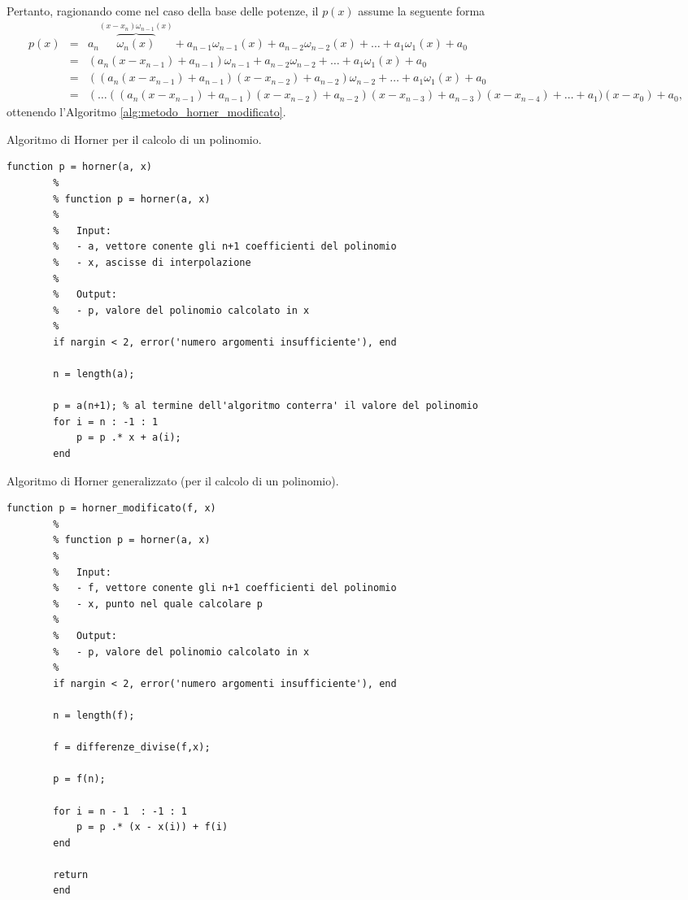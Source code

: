 
\noindent Pertanto, ragionando come nel caso della base delle potenze, il $p(x)$ assume la seguente forma
\begin{equation*}
	\begin{matrix}
		p(x) &=& a_n \overbrace{\omega_{n}(x)}^{(x-x_n)\omega_{n-1}(x)} + a_{n-1} \omega_{n-1}(x) + a_{n-2} \omega_{n-2}(x) + \hdots + a_1 \omega_1(x) + a_0\\
		&=& (a_n (x-x_{n-1}) + a_{n-1}) \omega_{n-1} + a_{n-2} \omega_{n-2} + \hdots + a_1 \omega_1(x) + a_0\\
		&=& ((a_n (x - x_{n-1}) + a_{n-1})(x-x_{n-2}) + a_{n-2})\omega_{n-2} + \hdots + a_1 \omega_1(x) + a_0\\
		&=& (\hdots ((a_n (x-x_{n-1}) + a_{n-1})(x - x_{n-2}) + a_{n-2})(x-x_{n-3}) + a_{n-3})(x-x_{n-4}) + \hdots + a_1 ) (x-x_0) + a_0,
	\end{matrix}
\end{equation*}
ottenendo l'Algoritmo \ref{alg:metodo_horner_modificato}.

\begin{algorithm}
\caption{Algoritmo di Horner per il calcolo di un polinomio.}\label{alg:metodo_horner}
    \begin{lstlisting}[style=Matlab-editor]
    	function p = horner(a, x)
    	%
    	% function p = horner(a, x)
    	%
    	%	Input: 
    	%	- a, vettore conente gli n+1 coefficienti del polinomio
    	%	- x, ascisse di interpolazione
    	%
    	%	Output:
    	%	- p, valore del polinomio calcolato in x
    	%
    	if nargin < 2, error('numero argomenti insufficiente'), end 
    	
    	n = length(a);
    	
        p = a(n+1); % al termine dell'algoritmo conterra' il valore del polinomio
        for i = n : -1 : 1
            p = p .* x + a(i);
        end
    \end{lstlisting}
\end{algorithm}

\begin{algorithm}
\caption{Algoritmo di Horner generalizzato (per il calcolo di un polinomio).}\label{alg:metodo_horner_modificato}
    \begin{lstlisting}[style=Matlab-editor]
    	function p = horner_modificato(f, x)
    	% 
    	% function p = horner(a, x)
    	%
    	%	Input: 
    	%	- f, vettore conente gli n+1 coefficienti del polinomio
    	%	- x, punto nel quale calcolare p
    	%
    	%	Output:
    	%	- p, valore del polinomio calcolato in x
    	%
    	if nargin < 2, error('numero argomenti insufficiente'), end 
    	
    	n = length(f);
    	
    	f = differenze_divise(f,x);
    	
        p = f(n);
        
        for i = n - 1  : -1 : 1
            p = p .* (x - x(i)) + f(i)
        end
        
        return
        end
    \end{lstlisting}
\end{algorithm}

